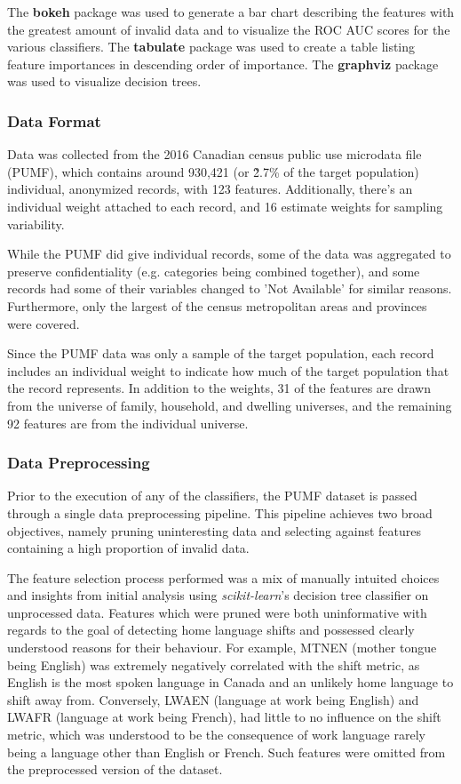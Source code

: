 \documentclass[10pt, conference, compsocconf]{IEEEtran}
\begin{document}
The \textbf{bokeh} package was used to generate a bar chart describing the features with the greatest amount of invalid data and to visualize the ROC AUC scores for the various classifiers. The \textbf{tabulate} package was used to create a table listing feature importances in descending order of importance. The \textbf{graphviz} package was used to visualize decision trees.

\subsubsection{Data Format}
Data was collected from the 2016 Canadian census public use microdata file (PUMF), which contains around 930,421 (or \~2.7\% of the target population) individual, anonymized records, with 123 features. Additionally, there's an individual weight attached to each record, and 16 estimate weights for sampling variability.

While the PUMF did give individual records, some of the data was aggregated to preserve confidentiality (e.g. categories being combined together), and some records had some of their variables changed to 'Not Available' for similar reasons. Furthermore, only the largest of the census metropolitan areas and provinces were covered. 

Since the PUMF data was only a sample of the target population, each record includes an individual weight to indicate how much of the target population that the record represents. In addition to the weights, 31 of the features are drawn from the universe of family, household, and dwelling universes, and the remaining 92 features are from the individual universe.

\subsubsection{Data Preprocessing}
Prior to the execution of any of the classifiers, the PUMF dataset is passed through a single data preprocessing pipeline.  This pipeline achieves two broad objectives, namely pruning uninteresting data and selecting against features containing a high proportion of invalid data.


The feature selection process performed was a mix of manually intuited choices and insights from initial analysis using \textit{scikit-learn}'s decision tree classifier on unprocessed data.  Features which were pruned were both uninformative with regards to the goal of detecting home language shifts and possessed clearly understood reasons for their behaviour.  For example, MTNEN (mother tongue being English) was extremely negatively correlated with the shift metric, as English is the most spoken language in Canada and an unlikely home language to shift away from.  Conversely, LWAEN (language at work being English) and LWAFR (language at work being French), had little to no influence on the shift metric, which was understood to be the consequence of work language rarely being a language other than English or French.  Such features were omitted from the preprocessed version of the dataset.
\end{document}
